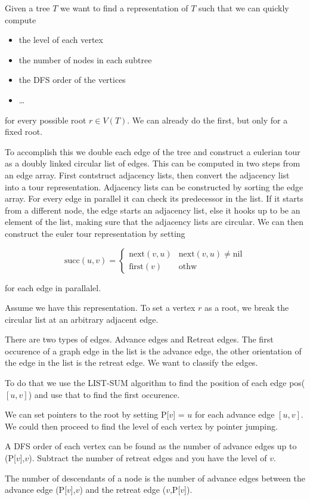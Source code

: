 Given a tree $T$ we want to find a representation of $T$ such that we can quickly compute 

\begin{itemize}
\item the level of each vertex
\item the number of nodes in each subtree
\item the DFS order of the vertices
\item \ldots
\end{itemize}

for every possible root $r\in V(T)$. We can already do the first, but only for a fixed root.

To accomplish this we double each edge of the tree and construct a eulerian tour as a doubly linked circular list of edges. This can be computed in two steps from an edge array. First contstruct adjacency lists, then convert the adjacency list into a tour representation. Adjacency lists can be constructed by sorting the edge array. For every edge in parallel it can check its predecessor in the list. If it starts from a different node, the edge starts an adjacency list, else it hooks up to be an element of the list, making sure that the adjacency lists are circular. We can then construct the euler tour representation by setting

\[\text{succ}(u,v) = \begin{cases} \text{next}(v,u) & \text{next}(v,u)\neq \text{nil}\\ \text{first}(v) & \text{othw}\end{cases}\]

for each edge in parallalel.

Assume we have this representation. To set a vertex $r$ as a root, we break the circular list at an arbitrary adjacent edge.

There are two types of edges. Advance edges and Retreat edges. The first occurence of a graph edge in the list is the advance edge, the other orientation of the edge in the list is the retreat edge. We want to classify the edges.

To do that we use the LIST-SUM algorithm to find the position of each edge pos($[u,v]$) and use that to find the first occurence.

We can set pointers to the root by setting P[$v$] = $u$ for each advance edge $[u,v]$. We could then proceed to find the level of each vertex by pointer jumping. 

A DFS order of each vertex can be found as the number of advance edges up to (P[$v$],$v$). Subtract the number of retreat edges and you have the level of $v$.

The number of descendants of a node is the number of advance edges between the advance edge (P[$v$],$v$) and the retreat edge ($v$,P[$v$]).



